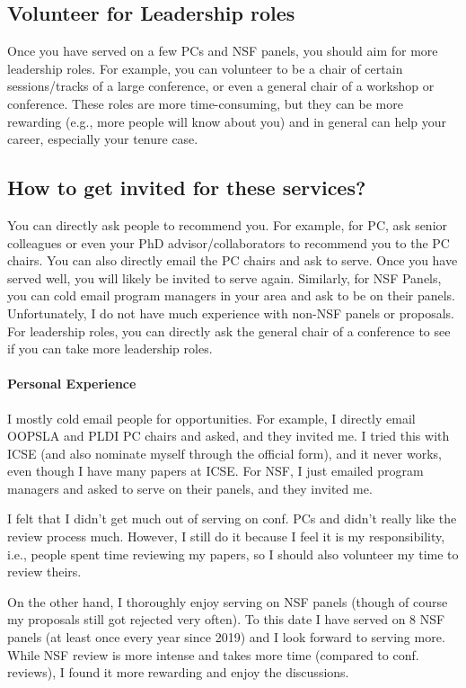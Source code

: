 \documentclass[oneside,11pt,dvipsnames]{book}
\begin{document}
\subsection{Volunteer for Leadership roles} Once you have served on a few PCs and NSF panels, you should aim for more leadership roles.  For example, you can volunteer to be a chair of certain sessions/tracks of a large conference, or even a general chair of a workshop or conference.  These roles are more time-consuming, but they can be more rewarding (e.g., more people will know about you) and in general can help your career, especially your tenure case.

\subsection{How to get invited for these services?} 

You can directly ask people to recommend you. For example, for PC, ask senior colleagues or even your PhD advisor/collaborators to recommend you to the PC chairs. You can also directly email the PC chairs and ask to serve.  Once you have served well, you will likely be invited to serve again.  
Similarly, for NSF Panels, you can cold email program managers in your area and ask to be on their panels.  Unfortunately, I do not have much experience with non-NSF panels or proposals. For leadership roles, you can directly ask the general chair of a conference to see if you can take more leadership roles.

\paragraph{Personal Experience} I mostly cold email people for opportunities. For example, I directly email OOPSLA and PLDI PC chairs and asked, and they invited me. I tried this with ICSE (and also nominate myself through the official form), and it never works, even though I have many papers at ICSE. 
For NSF, I just emailed program managers and asked to serve on their panels, and they invited me.

I felt that I didn't get much out of serving on conf. PCs and didn't really like the review process much.
However, I still do it because I feel it is my responsibility, i.e., people spent time reviewing my papers, so I should also volunteer my time to review theirs.

On the other hand, I thoroughly enjoy serving on NSF panels (though of course my proposals still got rejected very often). To this date I have served on 8 NSF panels (at least once every year since 2019) and I look forward to serving more. While NSF review is more intense and takes more time (compared to conf. reviews), I found it more rewarding and enjoy the discussions. 
\end{document}
